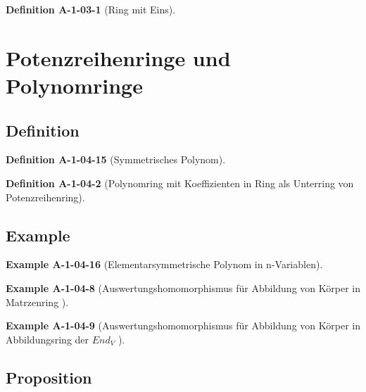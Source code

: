 \documentclass[10pt, letterpaper]{article}
\newcommand{\CustomHeading}[3]{%
  \par\medskip\noindent%
  \textbf{#1 #2} \textnormal{(#3)}.\enskip%
}
\newenvironment{DEF}[2]{\CustomHeading{Definition}{#1}{#2}}{}
\newenvironment{EXA}[2]{\CustomHeading{Example}{#1}{#2}}{}
\begin{document}
\begin{DEF}{A-1-03-1}{Ring mit Eins}

\end{DEF}






\section{Potenzreihenringe und Polynomringe}

\subsection{Definition}

\begin{DEF}{A-1-04-15}{Symmetrisches Polynom}

\end{DEF}

\begin{DEF}{A-1-04-2}{Polynomring mit Koeffizienten in Ring als Unterring von Potenzreihenring}

\end{DEF}







\subsection{Example}



\begin{EXA}{A-1-04-16}{Elementarsymmetrische Polynom in n-Variablen}

\end{EXA}

\begin{EXA}{A-1-04-8}{Auswertungshomomorphismus für Abbildung von Körper in Matrzenring }

\end{EXA}

\begin{EXA}{A-1-04-9}{Auswertungshomomorphismus für Abbildung von Körper in Abbildungsring der $End_V$ }

\end{EXA}







\subsection{Proposition}
\end{document}
